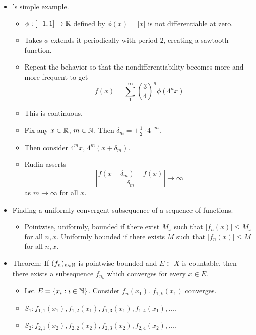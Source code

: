 \documentclass[../../notes.tex]{subfiles}
\begin{document}
\begin{itemize}
\begin{itemize}
\begin{itemize}
        \end{itemize}
    \end{itemize}
    \item \textcite{bib:Rudin}'s simple example.
    \begin{itemize}
        \item $\phi:[-1,1]\to\mathbb{R}$ defined by $\phi(x)=|x|$ is not differentiable at zero.
        \item Takes $\phi$ extends it periodically with period $2$, creating a sawtooth function.
        \item Repeat the behavior so that the nondifferentiability becomes more and more frequent to get
        \begin{equation*}
            f(x) = \sum_1^\infty\left( \frac{3}{4} \right)^n\phi(4^nx)
        \end{equation*}
        \item This is continuous.
        \item Fix any $x\in\mathbb{R}$, $m\in\mathbb{N}$. Then $\delta_m=\pm\frac{1}{2}\cdot 4^{-m}$.
        \item Then consider $4^mx$, $4^m(x+\delta_m)$.
        \item Rudin asserts
        \begin{equation*}
            \left| \frac{f(x+\delta_m)-f(x)}{\delta_m} \right| \to\infty
        \end{equation*}
        as $m\to\infty$ for all $x$.
    \end{itemize}
    \item {}Finding a uniformly convergent subsequence of a sequence of functions.
    \begin{itemize}
        \item Pointwise, uniformly, bounded if there exist $M_x$ such that $|f_n(x)|\leq M_x$ for all $n,x$. Uniformly bounded if there exists $M$ such that $|f_n(x)|\leq M$ for all $n,x$.
    \end{itemize}
    \item Theorem: If $(f_n)_{n\in\mathbb{N}}$ is pointwise bounded and $E\subset X$ is countable, then there exists a subsequence $f_{n_k}$ which converges for every $x\in E$.
    \begin{itemize}
        \item Let $E=\{x_i:i\in\mathbb{N}\}$. Consider $f_n(x_1)$. $f_{1,k}(x_1)$ converges.
        \item $S_1:f_{1,1}(x_1),f_{1,2}(x_1),f_{1,3}(x_1),f_{1,4}(x_1),\dots$.
        \item $S_2:f_{2,1}(x_2),f_{2,2}(x_2),f_{2,3}(x_2),f_{2,4}(x_2),\dots$.

\end{itemize}
\end{itemize}
\end{document}
